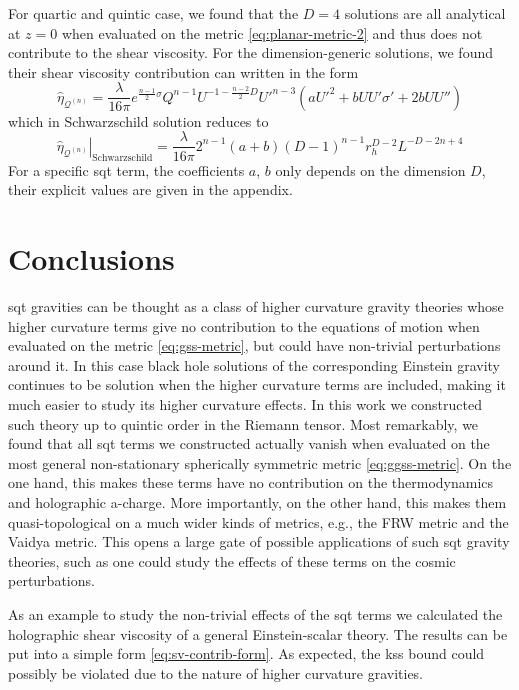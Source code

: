 \documentclass[a4paper,11pt]{article}
\begin{document}
For quartic and quintic case, we found that the $D = 4$ solutions are all analytical at $z = 0$ when evaluated on the metric \eqref{eq:planar-metric-2} and thus does not contribute to the shear viscosity. For the dimension-generic solutions, we found their shear viscosity contribution can written in the form
\begin{equation}\label{eq:sv-contrib-form}
    \hat\eta_{\mathcal Q^{(n)}} = \frac{\lambda}{16\pi}e^{\frac{n - 1}{2}\sigma} Q^{n-1}U^{-1 - \frac{n-2}{2}D} U'^{n - 3}\left(a U'^2 + b UU'\sigma' + 2b UU''\right)
\end{equation}
which in Schwarzschild solution reduces to
\begin{equation}
    \left.\hat\eta_{\mathcal Q^{(n)}}\right|_{\mathrm{Schwarzschild}} = \frac{\lambda}{16\pi}2^{n-1} (a + b) (D - 1)^{n-1} r_h^{D - 2} L^{-D - 2n + 4}
\end{equation}
For a specific \ac{sqt} term, the coefficients $a$, $b$ only depends on the dimension $D$, their explicit values are given in the appendix. 

\section{Conclusions}
\label{sec:conc}

\Ac{sqt} gravities can be thought as a class of higher curvature gravity theories whose higher curvature terms give no contribution to the equations of motion when evaluated on the metric \eqref{eq:gss-metric}, but could have non-trivial perturbations around it. In this case black hole solutions of the corresponding Einstein gravity continues to be solution when the higher curvature terms are included, making it much easier to study its higher curvature effects. In this work we constructed such theory up to quintic order in the Riemann tensor. Most remarkably, we found that all \ac{sqt} terms we constructed actually vanish when evaluated on the most general non-stationary spherically symmetric metric \eqref{eq:ggss-metric}. On the one hand, this makes these terms have no contribution on the thermodynamics and holographic a-charge. More importantly, on the other hand, this makes them quasi-topological on a much wider kinds of metrics, e.g., the FRW metric and the Vaidya metric. This opens a large gate of possible applications of such \ac{sqt} gravity theories, such as one could study the effects of these terms on the cosmic perturbations.

As an example to study the non-trivial effects of the \ac{sqt} terms we calculated the holographic shear viscosity of a general Einstein-scalar theory. The results can be put into a simple form \eqref{eq:sv-contrib-form}. As expected, the \ac{kss} bound could possibly be violated due to the nature of higher curvature gravities.
\end{document}
